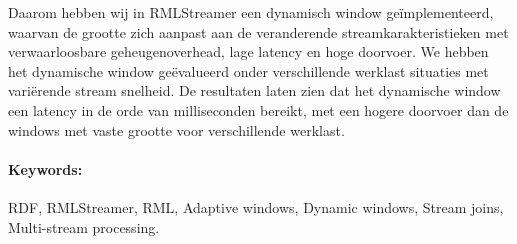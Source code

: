 Daarom hebben wij in RMLStreamer een dynamisch window geïmplementeerd, 
waarvan de grootte zich aanpast aan de veranderende streamkarakteristieken met 
verwaarloosbare geheugenoverhead, lage latency en hoge doorvoer.
We hebben het dynamische window geëvalueerd onder verschillende werklast situaties 
met variërende stream snelheid.
De resultaten laten zien dat het dynamische window een latency 
in de orde van milliseconden bereikt, 
met een hogere doorvoer dan de windows met vaste grootte voor verschillende werklast.

\paragraph{Keywords:}

RDF, RMLStreamer, RML, Adaptive windows, Dynamic windows,
Stream joins, Multi-stream processing.

